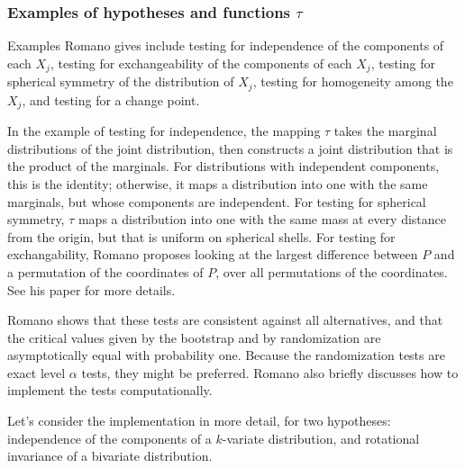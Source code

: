 \subsubsection{Examples of hypotheses and functions $\tau$}
Examples Romano gives include testing for independence of the components of each $X_j$,
testing for exchangeability of the components of each $X_j$, testing for spherical
symmetry of the distribution of $X_j$, testing for homogeneity among the $X_j$, and
testing for a change point.

In the example of testing for independence, the mapping $\tau$ takes the marginal
distributions of the joint distribution, then constructs a joint distribution that
is the product of the marginals.  For distributions with independent components,
this is the identity; otherwise, it maps a distribution into one with the same
marginals, but whose components are independent.
For testing for spherical symmetry, $\tau$ maps a distribution into one with the same  mass
at every distance from the origin, but that is uniform on spherical shells.
For testing for exchangability, Romano proposes looking at the largest difference between
$P$ and a permutation of the coordinates of $P$, over all permutations of the coordinates.
See his paper for more details.

Romano shows that these tests are consistent against all alternatives, and that
the critical values given by the bootstrap and by randomization are asymptotically
equal with probability one.  Because the randomization tests are exact level $\alpha$
tests, they might be preferred.  Romano also briefly discusses how to implement the tests
computationally.

Let's consider the implementation in more detail, for two hypotheses:
independence of the components of a $k$-variate distribution, and
rotational invariance of a bivariate distribution.

